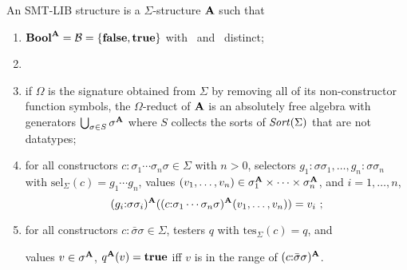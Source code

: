 \begin{definition}
\label{def:structure}
An SMT-LIB structure is a $\Sigma$-structure $\mathbf{A}$ such that

\begin{enumerate}
\item $\textbf{Bool}^{\mathbf{A}} = \mathcal{B} = \{ \textbf{false}, \textbf{true} \}$ with \false\ and \true\ distinct;

\item {}


%

\item
if $\Omega$ is the signature obtained from $\Sigma$ by removing 
all of its non-constructor function symbols,
the $\Omega$-reduct of $\mathbf{A}$ is an absolutely free algebra with 
generators $\bigcup_{ \sigma \in S} \sigma^{\mathbf{A}}$
where $S$ collects the sorts of $\mathit{Sort}(\Sigma)$ that are not datatypes;

\item
for all constructors $c{:}\sigma_1\cdots\sigma_n\sigma \in \Sigma$ with $n>0$,
selectors $g_1{:}\sigma\sigma_1, \ldots, g_n{:}\sigma\sigma_n$ 
with $\mathrm{sel}_\Sigma(c) = g_1\cdots g_n$, 
values $(v_1, \ldots, v_n) \in \sigma_1^{\mathbf{A}} \times \cdots \times \sigma_n^{\mathbf{A}}$,
and
$i=1,\ldots,n$,
\[
 (g_i{:}\sigma\sigma_i)^{\str A}((c{:}\sigma_1\cdots\sigma_n\sigma)^{\str A}(v_1, \ldots, v_n)) = v_i\ ;
\]

\item
for all constructors $c{:}\bar{\sigma}\sigma \in \Sigma$,
testers $q$ with $\mathrm{tes}_\Sigma(c) = q$, and 
\begin{center}
  values $v \in \sigma^{\mathbf{A}}$,
 $q^{\mathbf{A}}(v) = \textbf{true}$ iff $v$ is in the range of $(c{:}\bar{\sigma}\sigma)^{\mathbf{A}}$.
\end{center}
\end{enumerate}
\end{definition}


